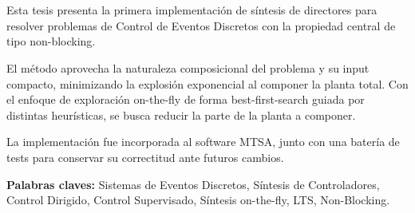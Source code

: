 \chapter*{\runtitulo}

\noindent 

Esta tesis presenta la primera implementación de síntesis de directores para resolver problemas de Control de Eventos Discretos con la propiedad central de tipo non-blocking.

El método aprovecha la naturaleza composicional del problema y su input compacto, minimizando la explosión exponencial al componer la planta total. Con el enfoque de exploración on-the-fly de forma best-first-search guiada por distintas heurísticas, se busca reducir la parte de la planta a componer. 

La implementación fue incorporada al software MTSA\cite{mtsaRepo}, junto con una batería de tests para conservar su correctitud ante futuros cambios.
 


%
%

\bigskip

\noindent\textbf{Palabras claves:} Sistemas de Eventos Discretos, Síntesis de Controladores, Control Dirigido, Control Supervisado, Síntesis on-the-fly, LTS, Non-Blocking.


